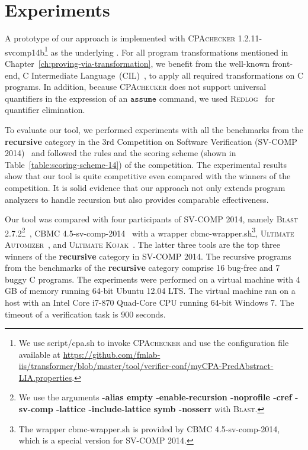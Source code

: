 
\newcommand{\safe}{S}
\newcommand{\unsafe}{U}
\newcommand{\unknown}{?}
\newcommand{\exception}{E}
\newcommand{\timeout}{T.O.}
\newcommand{\unknownmark}{\ensuremath{^?}}
\newcommand{\wrongmark}{\ensuremath{^!}}

\chapter{Experiments}\label{ch:experiments}
A prototype of our approach is implemented with
\textsc{CPAchecker} 1.2.11-svcomp14b\footnote{
  We use script/cpa.sh to invoke \textsc{CPAchecker} and use the configuration
  file available at
  \url{https://github.com/fmlab-iis/transformer/blob/master/tool/verifier-conf/myCPA-PredAbstract-LIA.properties}.
}
as the underlying .
For all program transformations mentioned in
Chapter~\ref{ch:proving-via-transformation},
we benefit from the well-known front-end,
C Intermediate Language~(\textsc{CIL})~\cite{NeculaMRW02,cil}, to apply all required
transformations on C programs.
In addition, because \textsc{CPAchecker} does not support universal quantifiers
in the expression of an $\mathtt{assume}$ command,
we used \textsc{Redlog}~\cite{Dolzmann97,redlog} for quantifier elimination.


To evaluate our tool, we performed experiments with all the benchmarks
from the \textbf{recursive} category in the 3rd Competition on
Software Verification (SV-COMP 2014)~\cite{svcomp14} and followed the
rules and the scoring scheme (shown in Table~\ref{table:scoring-scheme-14})
of the competition.
The experimental results show that our tool is quite competitive even compared
with the winners of the competition.
It is solid evidence that our approach not only extends program analyzers to
handle recursion but also provides comparable effectiveness.

Our tool was compared with four participants of
SV-COMP 2014, namely \textsc{Blast} 2.7.2\footnote{We use the
  arguments \textbf{-alias empty -enable-recursion -noprofile -cref
    -sv-comp -lattice -include-lattice symb -nosserr} with
  \textsc{Blast}.}~\cite{BeyerHJM07},
CBMC 4.5-sv-comp-2014~\cite{ClarkeKL04} with a wrapper
cbmc-wrapper.sh\footnote{The wrapper cbmc-wrapper.sh is provided by
  CBMC 4.5-sv-comp-2014, which is a special version for SV-COMP
  2014.}, \textsc{Ultimate Automizer}~\cite{HeizmannCDEHLNSP13}, and \textsc{Ultimate
Kojak}~\cite{ErmisNDHP14}.
The latter three tools are the top three winners of the
\textbf{recursive} category in SV-COMP 2014.
The recursive programs from the benchmarks of the \textbf{recursive}
category comprise 16 bug-free and 7 buggy C programs.
The experiments were performed on a virtual machine with 4 GB of memory
running 64-bit Ubuntu 12.04 LTS. 
The virtual machine ran on a host with an Intel Core i7-870 Quad-Core
CPU running 64-bit Windows 7.
The timeout of a verification task is 900 seconds.

